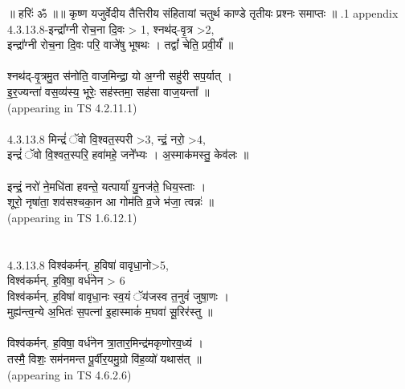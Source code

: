 \documentclass[17pt]{extarticle}
\begin{document}
॥ हरिः॑ ॐ ॥॥ कृष्ण यजुर्वेदीय तैत्तिरीय संहितायां चतुर्थ काण्डे तृतीयः प्रश्नः समाप्तः ॥ \newline
{}.1   appendix\\4.3.13.8-इन्द्रा᳚ग्नी रोच॒ना दि॒वः > 1, श्नथ॑द्-वृ॒त्र >2, \\इन्द्रा᳚ग्नी रोच॒ना दि॒वः परि॒ वाजे॑षु भूषथः । तद्वां᳚ चेति॒ प्रवी॒र्यं᳚ ॥\\\\श्नथ॑द्-वृ॒त्रमु॒त स॑नोति॒ वाज॒मिन्द्रा॒ यो अ॒ग्नी सहु॑री सप॒र्यात् । \\इ॒र॒ज्यन्ता॑ वस॒व्य॑स्य॒ भूरेः॒ सह॑स्तमा॒ सह॑सा वाज॒यन्ता᳚ ॥\\(appearing in TS 4.2.11.1) \\\\4.3.13.8 मिन्द्रं॑ ॅवो वि॒श्वत॒स्परी >3, न्द्रं॒ नरो॒ >4, \\इन्द्रं॑ ॅवो वि॒श्वत॒स्परि॒ हवा॑महे॒ जने᳚भ्यः । अ॒स्माक॑मस्तु॒ केव॑लः ॥ \\\\इन्द्रं॒ नरो॑ ने॒मधि॑ता हवन्ते॒ यत्पार्या॑ यु॒नज॑ते॒ धिय॒स्ताः ।\\शूरो॒ नृषा॑ता॒ शव॑सश्चका॒न आ गोम॑ति व्र॒जे भ॑जा॒ त्वन्नः॑ ॥\\(appearing in TS 1.6.12.1)\\\\\\4.3.13.8 विश्व॑कर्मन्. ह॒विषा॑ वावृधा॒नो>5, \\विश्व॑कर्मन्. ह॒विषा॒ वर्ध॑नेन > 6 \\विश्व॑कर्मन्. ह॒विषा॑ वावृधा॒नः स्व॒यं ॅय॑जस्व त॒नुवं॑ जुषा॒णः ।\\मुह्य॑न्त्व॒न्ये अ॒भितः॑ स॒पत्ना॑ इ॒हास्माकं॑ म॒घवा॑ सू॒रिर॑स्तु ॥\\\\विश्व॑कर्मन्. ह॒विषा॒ वर्ध॑नेन त्रा॒तार॒मिन्द्र॑मकृणोरव॒ध्यं ।\\तस्मै॒ विशः॒ सम॑नमन्त पू॒र्वीर॒यमु॒ग्रो वि॑ह॒व्यो॑ यथास॑त् ॥\\(appearing in TS 4.6.2.6)\\
\pagebreak
        
\end{document}
